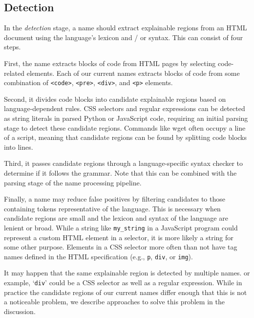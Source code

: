 \subsection{Detection}
In the \emph{detection} stage, a \Gls{name} should extract explainable regions from an HTML document using the language's lexicon and / or syntax.
This can consist of four steps.

First, the \Gls{name} extracts blocks of code from HTML pages by selecting code-related elements.
Each of our current \Glspl{name} extracts blocks of code from some combination of \texttt{<code>}, \texttt{<pre>}, \texttt{<div>}, and \texttt{<p>} elements.

Second, it divides code blocks into candidate explainable regions based on language-dependent rules.
CSS selectors and regular expressions can be detected as string literals in parsed Python or JavaScript code, requiring an initial parsing stage to detect these candidate regions.
Commands like wget often occupy a line of a script, meaning that candidate regions can be found by splitting code blocks into lines.

Third, it passes candidate regions through a language-specific syntax checker to determine if it follows the grammar.
Note that this can be combined with the parsing stage of the \Gls{name} processing pipeline.

Finally, a \Gls{name} may reduce false positives by filtering candidates to those containing tokens representative of the language.
This is necessary when candidate regions are small and the lexicon and syntax of the language are lenient or broad.
While a string like \texttt{\qs{}my\_string\qs{}} in a JavaScript program could represent a custom HTML element in a selector, it is more likely a string for some other purpose.
Elements in a CSS selector more often than not have tag names defined in the HTML specification (e.g., \texttt{p}, \texttt{div}, or \texttt{img}).

\begin{changes}
It may happen that the same explainable region is detected by multiple \Glspl{name}.
or example, `\texttt{div}' could be a CSS selector as well as a regular expression.
While in practice the candidate regions of our current \Glspl{name} differ enough that this is not a noticeable problem, we describe approaches to solve this problem in the discussion.
\end{changes}


